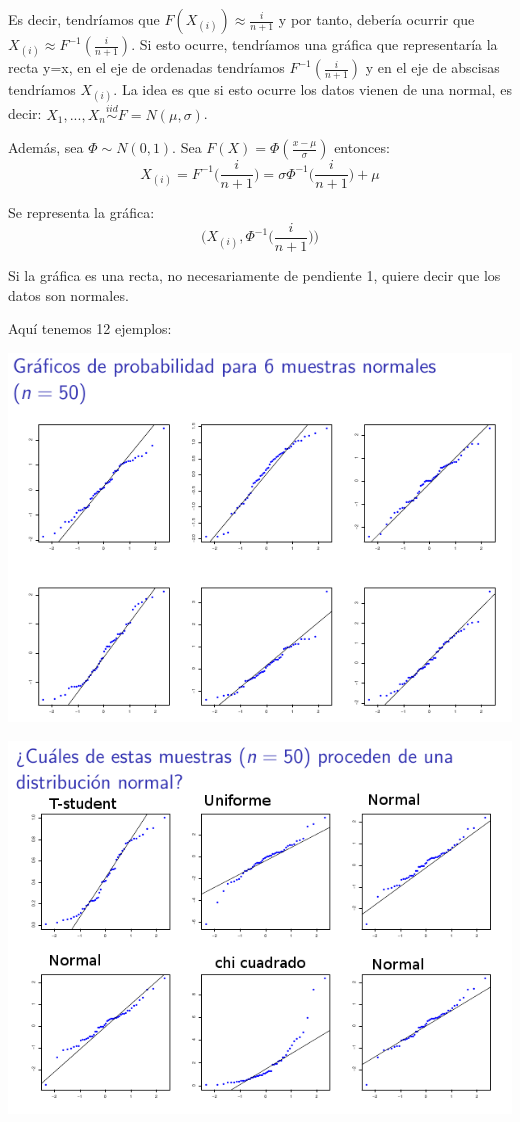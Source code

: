 \documentclass[palatino,nochap]{apuntes}
\begin{document}
Es decir, tendríamos que $F(X_{(i)}) \approx \frac{i}{n+1}$ y por tanto, debería ocurrir que $X_{(i)} \approx F^{-1}(\frac{i}{n+1})$. Si esto ocurre, tendríamos una gráfica que representaría la recta y=x, en el eje de ordenadas tendríamos $F^{-1}(\frac{i}{n+1})$ y en el eje de abscisas tendríamos $X_{(i)}$. La idea es que si esto ocurre los datos vienen de una normal, es decir: $X_1,...,X_n \stackrel{iid}{\sim} F=N(\mu, \sigma)$.

Además, sea $\Phi \sim N(0,1)$. Sea $F(X) = \Phi(\frac{x-\mu}{\sigma})$ entonces:
$$ X_{(i)} = F^{-1}\Big(\frac{i}{n+1}\Big) = \sigma \Phi^{-1}\Big(\frac{i}{n+1}\Big)+ \mu $$

Se representa la gráfica:
$$ \bigg( X_{(i)}, \Phi^{-1}\Big(\frac{i}{n+1}\Big) \bigg)$$

Si la gráfica es una recta, no necesariamente de pendiente 1, quiere decir que los datos son normales.

Aquí tenemos 12 ejemplos:

\includegraphics[scale=0.6]{img/graficos1.png}

\includegraphics[scale=0.6]{img/graficos2.png}
\end{document}
